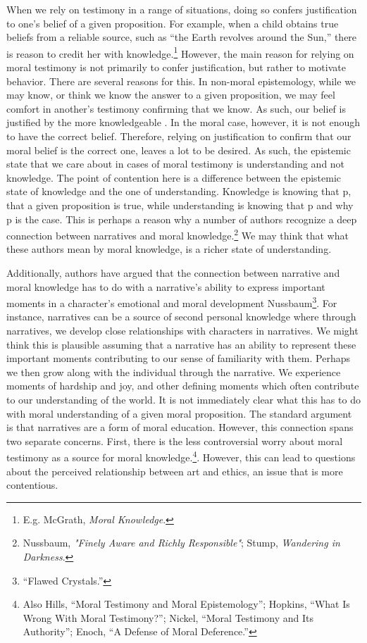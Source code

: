 \documentclass[phdthesis,12pt,final,a4paper]{wuthesis}
\theoremstyle{definition}
\theoremstyle{definition}
\theoremstyle{definition}
\theoremstyle{definition}
\theoremstyle{remark}
\begin{document}
When we rely on testimony in a range of situations, doing so confers justification to one's belief of a given proposition. For example, when a child obtains true beliefs from a reliable source, such as ``the Earth revolves around the Sun,'' there is reason to credit her with knowledge.\footnote{E.g. McGrath, \emph{Moral {Knowledge}}.} However, the main reason for relying on moral testimony is not primarily to confer justification, but rather to motivate behavior. There are several reasons for this. In non-moral epistemology, while we may know, or think we know the answer to a given proposition, we may feel comfort in another's testimony confirming that we know. As such, our belief is justified by the more knowledgeable . In the moral case, however, it is not enough to have the correct belief. Therefore, relying on justification to confirm that our moral belief is the correct one, leaves a lot to be desired. As such, the epistemic state that we care about in cases of moral testimony is understanding and not knowledge. The point of contention here is a difference between the epistemic state of knowledge and the one of understanding. Knowledge is knowing that p, that a given proposition is true, while understanding is knowing that p and why p is the case. This is perhaps a reason why a number of authors recognize a deep connection between narratives and moral knowledge.\footnote{Nussbaum, \emph{"{Finely Aware} and {Richly Responsible}"}; Stump, \emph{Wandering in {Darkness}}.} We may think that what these authors mean by moral knowledge, is a richer state of understanding.

Additionally, authors have argued that the connection between narrative and moral knowledge has to do with a narrative's ability to express important moments in a character's emotional and moral development Nussbaum\footnote{{``Flawed {Crystals}.''}}. For instance, narratives can be a source of second personal knowledge where through narratives, we develop close relationships with characters in narratives. We might think this is plausible assuming that a narrative has an ability to represent these important moments contributing to our sense of familiarity with them. Perhaps we then grow along with the individual through the narrative. We experience moments of hardship and joy, and other defining moments which often contribute to our understanding of the world. It is not immediately clear what this has to do with moral understanding of a given moral proposition. The standard argument is that narratives are a form of moral education. However, this connection spans two separate concerns. First, there is the less controversial worry about moral testimony as a source for moral knowledge.\footnote{Also Hills, {``Moral Testimony and Moral Epistemology''}; Hopkins, {``What {Is Wrong With Moral Testimony}?''}; Nickel, {``Moral {Testimony} and Its {Authority}''}; Enoch, {``A {Defense} of {Moral Deference}.''}}. However, this can lead to questions about the perceived relationship between art and ethics, an issue that is more contentious.
\end{document}
